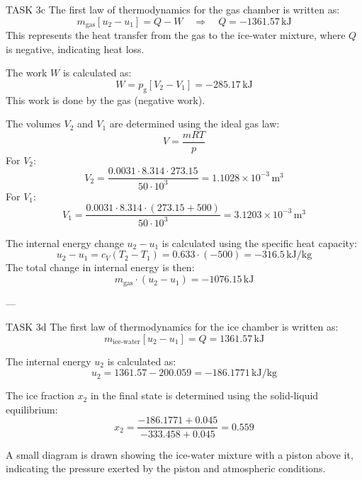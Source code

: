 TASK 3c  
The first law of thermodynamics for the gas chamber is written as:  
\[
m_{\text{gas}} [u_2 - u_1] = Q - W \quad \Rightarrow \quad Q = -1361.57 \, \text{kJ}
\]  
This represents the heat transfer from the gas to the ice-water mixture, where \( Q \) is negative, indicating heat loss.

The work \( W \) is calculated as:  
\[
W = p_{\text{g}} \left[ V_2 - V_1 \right] = -285.17 \, \text{kJ}
\]  
This work is done by the gas (negative work).

The volumes \( V_2 \) and \( V_1 \) are determined using the ideal gas law:  
\[
V = \frac{m R T}{p}
\]  
For \( V_2 \):  
\[
V_2 = \frac{0.0031 \cdot 8.314 \cdot 273.15}{50 \cdot 10^3} = 1.1028 \times 10^{-3} \, \text{m}^3
\]  
For \( V_1 \):  
\[
V_1 = \frac{0.0031 \cdot 8.314 \cdot (273.15 + 500)}{50 \cdot 10^3} = 3.1203 \times 10^{-3} \, \text{m}^3
\]

The internal energy change \( u_2 - u_1 \) is calculated using the specific heat capacity:  
\[
u_2 - u_1 = c_V (T_2 - T_1) = 0.633 \cdot (-500) = -316.5 \, \text{kJ/kg}
\]  
The total change in internal energy is then:  
\[
m_{\text{gas}} \cdot (u_2 - u_1) = -1076.15 \, \text{kJ}
\]

---

TASK 3d  
The first law of thermodynamics for the ice chamber is written as:  
\[
m_{\text{ice-water}} [u_2 - u_1] = Q = 1361.57 \, \text{kJ}
\]  

The internal energy \( u_2 \) is calculated as:  
\[
u_2 = 1361.57 - 200.059 = -186.1771 \, \text{kJ/kg}
\]  

The ice fraction \( x_2 \) in the final state is determined using the solid-liquid equilibrium:  
\[
x_2 = \frac{-186.1771 + 0.045}{-333.458 + 0.045} = 0.559
\]  

A small diagram is drawn showing the ice-water mixture with a piston above it, indicating the pressure exerted by the piston and atmospheric conditions.